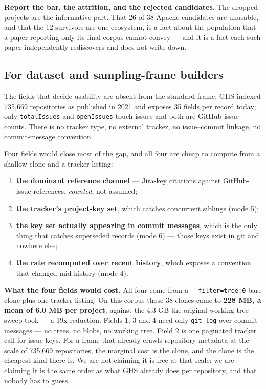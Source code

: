 \documentclass[conference]{IEEEtran}
\begin{document}
\textbf{Report the bar, the attrition, and the rejected candidates.} The dropped projects are the informative part. That 26 of 38 Apache candidates are unusable, and that the 12 survivors are one ecosystem, is a fact about the population that a paper reporting only its final corpus cannot convey --- and it is a fact each such paper independently rediscovers and does not write down.

\subsection{For dataset and sampling-frame builders}
\label{sec:7.2}

The fields that decide usability are absent from the standard frame. GHS indexed 735,669 repositories as published in 2021 and exposes 35 fields per record today; only \texttt{totalIssues} and \texttt{openIssues} touch issues and both are GitHub-issue counts. There is no tracker type, no external tracker, no issue--commit linkage, no commit-message convention.

Four fields would close most of the gap, and all four are cheap to compute from a shallow clone and a tracker listing:

\begin{enumerate}
\item \textbf{the dominant reference channel} --- Jira-key citations against GitHub-issue references, \emph{counted}, not assumed;
\item \textbf{the tracker's project-key set}, which catches concurrent siblings (mode 5);
\item \textbf{the key set actually appearing in commit messages}, which is the only thing that catches superseded records (mode 6) --- those keys exist in git and nowhere else;
\item \textbf{the rate recomputed over recent history}, which exposes a convention that changed mid-history (mode 4).
\end{enumerate}

\textbf{What the four fields would cost.} All four come from a \texttt{-\allowbreak{}-\allowbreak{}filter=tree:0} bare clone plus one tracker listing. On this corpus those 38 clones came to \textbf{228 MB, a mean of 6.0 MB per project}, against the 4.3 GB the original working-tree sweep took --- a 19x reduction. Fields 1, 3 and 4 need only \texttt{git log} over commit messages --- no trees, no blobs, no working tree. Field 2 is one paginated tracker call for issue keys. For a frame that already crawls repository metadata at the scale of 735,669 repositories, the marginal cost is the clone, and the clone is the cheapest kind there is. We are not claiming it is free at that scale; we are claiming it is the same order as what GHS already does per repository, and that nobody has to guess.
\end{document}
